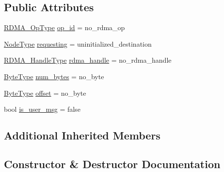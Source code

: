 \subsection*{Public Attributes}
\begin{DoxyCompactItemize}
\item 
\hyperlink{namespacevt_1_1rdma_a9b966d9780a2b41afe7cd7b7b4b20300}{R\+D\+M\+A\+\_\+\+Op\+Type} \hyperlink{structvt_1_1rdma_1_1_request_data_message_a622409576bf44670a1203992929c9869}{op\+\_\+id} = no\+\_\+rdma\+\_\+op
\item 
\hyperlink{namespacevt_a866da9d0efc19c0a1ce79e9e492f47e2}{Node\+Type} \hyperlink{structvt_1_1rdma_1_1_request_data_message_aaa35273a1209ef165ff196930c5d1891}{requesting} = uninitialized\+\_\+destination
\item 
\hyperlink{namespacevt_a10442579ec4e7ebef223818e64bcf908}{R\+D\+M\+A\+\_\+\+Handle\+Type} \hyperlink{structvt_1_1rdma_1_1_request_data_message_af405c0926174a99b19e148795461ce13}{rdma\+\_\+handle} = no\+\_\+rdma\+\_\+handle
\item 
\hyperlink{namespacevt_aab8d55968084610ce3b17057981e9300}{Byte\+Type} \hyperlink{structvt_1_1rdma_1_1_request_data_message_a7233a1b126b80aa06946ed15fad9d1b9}{num\+\_\+bytes} = no\+\_\+byte
\item 
\hyperlink{namespacevt_aab8d55968084610ce3b17057981e9300}{Byte\+Type} \hyperlink{structvt_1_1rdma_1_1_request_data_message_abe76ac0fa80365f6e3d64232e7e5ff8b}{offset} = no\+\_\+byte
\item 
bool \hyperlink{structvt_1_1rdma_1_1_request_data_message_a1f9eeffb6869c9703bb6ad3db5ef6ef1}{is\+\_\+user\+\_\+msg} = false
\end{DoxyCompactItemize}
\subsection*{Additional Inherited Members}


\subsection{Constructor \& Destructor Documentation}
\mbox{\label{structvt_1_1rdma_1_1_request_data_message_a9dee2c546d86b072f2929554402124a1}} 
